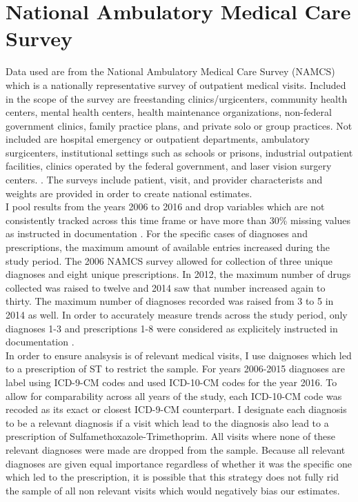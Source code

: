 \section{National Ambulatory Medical Care Survey}
Data used are from the National Ambulatory Medical Care Survey (NAMCS) which is a nationally representative survey of outpatient medical visits. Included in the scope of the survey are freestanding clinics/urgicenters, community health centers, mental health centers, health maintenance organizations,  non-federal government clinics, family practice plans, and private solo or group practices. Not included are hospital emergency or outpatient departments, ambulatory surgicenters, institutional settings such as schools or prisons, industrial outpatient facilities, clinics operated by the federal government, and laser vision surgery centers. \cite{hing_basic_nodate}. The surveys include patient, visit, and provider characterists and weights are provided in order to create national estimates.\\
\indent I pool results from the years 2006 to 2016 and drop variables which are not consistently tracked across this time frame or have more than 30\% missing values as instructed in documentation \cite{myrick_understanding_nodate}. For the specific cases of diagnoses and prescriptions, the maximum amount of available entries increased during the study period. The 2006 NAMCS survey allowed for collection of three unique diagnoses and eight unique prescriptions. In 2012, the maximum number of drugs collected was raised to twelve and 2014 saw that number increased again to thirty. The maximum number of diagnoses recorded was raised from 3 to 5 in 2014 as well. In order to accurately measure trends across the study period, only diagnoses 1-3 and prescriptions 1-8 were considered as explicitely instructed in documentation \cite{schappert_analyzing_nodate}.\\
\indent In order to ensure analsysis is of relevant medical visits, I use daignoses which led to a prescription of ST to restrict the sample. For years 2006-2015 diagnoses are label using ICD-9-CM codes and used ICD-10-CM codes for the year 2016. To allow for comparability across all years of the study, each ICD-10-CM code was recoded as its exact or closest ICD-9-CM counterpart. I designate each diagnosis to be a relevant diagnosis if a visit which lead to the diagnosis also lead to a prescription of Sulfamethoxazole-Trimethoprim. All visits where none of these relevant diagnoses were made are dropped from the sample. Because all relevant diagnoses are given equal importance regardless of whether it was the specific one which led to the prescription, it is possible that this strategy does not fully rid the sample of all non relevant visits which would negatively bias our estimates.\\

